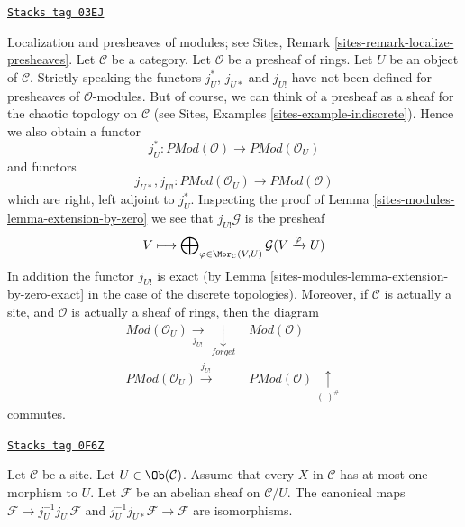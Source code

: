 \begin{remark}
\label{sites-modules-remark-localize-presheaves}
\href{https://stacks.math.columbia.edu/tag/03EJ}{\texttt{Stacks tag 03EJ}}

Localization and presheaves of modules; see
Sites, Remark \ref{sites-remark-localize-presheaves}.
Let $\mathcal{C}$ be a category.
Let $\mathcal{O}$ be a presheaf of rings.
Let $U$ be an object of $\mathcal{C}$.
Strictly speaking the functors $j_U^*$, $j_{U*}$ and $j_{U!}$
have not been defined for presheaves of $\mathcal{O}$-modules.
But of course, we can think of a presheaf as a sheaf for the
chaotic topology on $\mathcal{C}$ (see
Sites, Examples \ref{sites-example-indiscrete}).
Hence we also obtain a functor
$$
j_U^* :
\textit{PMod}(\mathcal{O})
\longrightarrow
\textit{PMod}(\mathcal{O}_U)
$$
and functors
$$
j_{U*}, j_{U!} :
\textit{PMod}(\mathcal{O}_U)
\longrightarrow
\textit{PMod}(\mathcal{O})
$$
which are right, left adjoint to $j_U^*$. Inspecting the proof of
Lemma \ref{sites-modules-lemma-extension-by-zero} we see that $j_{U!}\mathcal{G}$
is the presheaf
$$
V \longmapsto
\bigoplus\nolimits_{\varphi \in \Mor_\mathcal{C}(V, U)}
\mathcal{G}(V \xrightarrow{\varphi} U)
$$
In addition the functor $j_{U!}$ is exact (by
Lemma \ref{sites-modules-lemma-extension-by-zero-exact} in the
case of the discrete topologies). Moreover, if $\mathcal{C}$
is actually a site, and $\mathcal{O}$ is actually a sheaf of rings,
then the diagram
$$
\begin{array}{cc}\textit{Mod}(\mathcal{O}_U) \underset{j_{U!}}{\longrightarrow}\underset{forget}{\downarrow} & \textit{Mod}(\mathcal{O}) \\ \textit{PMod}(\mathcal{O}_U) \overset{j_{U!}}{\longrightarrow} & \textit{PMod}(\mathcal{O}) \underset{(\ )^\#}{\uparrow}\end{array}
$$
commutes.
\end{remark}

\begin{lemma}
\label{sites-modules-lemma-restrict-back}
\href{https://stacks.math.columbia.edu/tag/0F6Z}{\texttt{Stacks tag 0F6Z}}

Let $\mathcal{C}$ be a site. Let $U \in \Ob(\mathcal{C})$.
Assume that every $X$ in $\mathcal{C}$ has at most
one morphism to $U$. Let $\mathcal{F}$ be an abelian sheaf on $\mathcal{C}/U$.
The canonical maps $\mathcal{F} \to j_U^{-1}j_{U!}\mathcal{F}$
and $j_U^{-1}j_{U*}\mathcal{F} \to \mathcal{F}$ are
isomorphisms.
\end{lemma}

